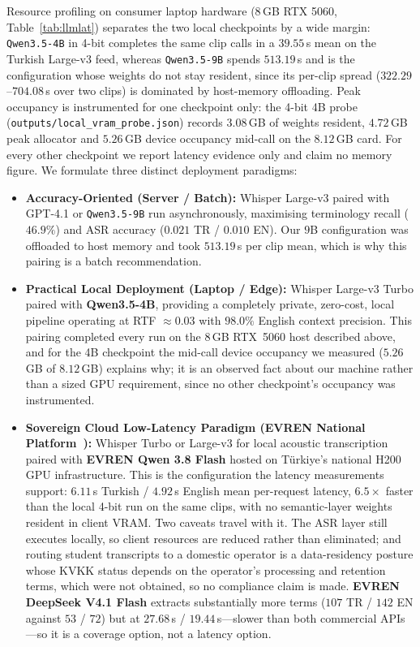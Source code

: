 \documentclass[conference]{IEEEtran}
\begin{document}
Resource profiling on consumer laptop hardware (8\,GB RTX 5060, Table~\ref{tab:llmlat}) separates the two local checkpoints by a wide margin: \texttt{Qwen3.5-4B} in 4-bit completes the same clip calls in a $39.55$\,s mean on the Turkish Large-v3 feed, whereas \texttt{Qwen3.5-9B} spends $513.19$\,s and is the configuration whose weights do not stay resident, since its per-clip spread ($322.29$--$704.08$\,s over two clips) is dominated by host-memory offloading. Peak occupancy is instrumented for one checkpoint only: the 4-bit 4B probe (\texttt{outputs/local\_vram\_probe.json}) records $3.08$\,GB of weights resident, $4.72$\,GB peak allocator and $5.26$\,GB device occupancy mid-call on the $8.12$\,GB card. For every other checkpoint we report latency evidence only and claim no memory figure. We formulate three distinct deployment paradigms:
\begin{itemize}
\item \textbf{Accuracy-Oriented (Server / Batch):} Whisper Large-v3 paired with GPT-4.1 or \texttt{Qwen3.5-9B} run asynchronously, maximising terminology recall ($46.9\%$) and ASR accuracy ($0.021$ TR / $0.010$ EN). Our $9$B configuration was offloaded to host memory and took $513.19$\,s per clip mean, which is why this pairing is a batch recommendation.
\item \textbf{Practical Local Deployment (Laptop / Edge):} Whisper Large-v3 Turbo paired with \textbf{Qwen3.5-4B}, providing a completely private, zero-cost, local pipeline operating at RTF $\approx 0.03$ with $98.0\%$ English context precision. This pairing completed every run on the 8\,GB RTX~5060 host described above, and for the 4B checkpoint the mid-call device occupancy we measured ($5.26$\,GB of $8.12$\,GB) explains why; it is an observed fact about our machine rather than a sized GPU requirement, since no other checkpoint's occupancy was instrumented.
\item \textbf{Sovereign Cloud Low-Latency Paradigm (EVREN National Platform~\cite{evren2026}):} Whisper Turbo or Large-v3 for local acoustic transcription paired with \textbf{EVREN Qwen 3.8 Flash} hosted on Türkiye's national H200 GPU infrastructure. This is the configuration the latency measurements support: $6.11$\,s Turkish / $4.92$\,s English mean per-request latency, $6.5\times$ faster than the local 4-bit run on the same clips, with no semantic-layer weights resident in client VRAM. Two caveats travel with it. The ASR layer still executes locally, so client resources are reduced rather than eliminated; and routing student transcripts to a domestic operator is a data-residency posture whose KVKK status depends on the operator's processing and retention terms, which were not obtained, so no compliance claim is made. \textbf{EVREN DeepSeek V4.1 Flash} extracts substantially more terms ($107$ TR / $142$ EN against $53$ / $72$) but at $27.68$\,s / $19.44$\,s---slower than both commercial APIs---so it is a coverage option, not a latency option.
\end{itemize}
\end{document}
